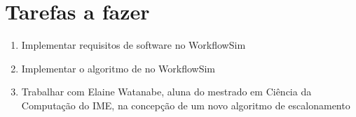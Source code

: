 \section{Tarefas a fazer}
\label{sec:tarefas_a_fazer}
	\begin{enumerate}
		\item Implementar requisitos de software no WorkflowSim
		\item Implementar o algoritmo de \cite{chaves:scheduling_software_requirements} 
		no WorkflowSim
		\item Trabalhar com Elaine Watanabe, aluna do mestrado em Ciência da
		Computação do IME, na concepção de um novo algoritmo 
		de escalonamento
	\end{enumerate}

